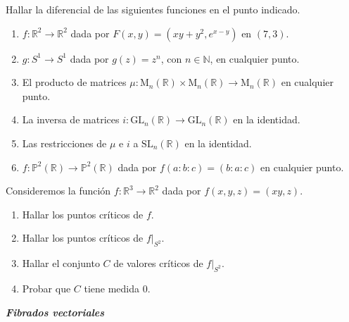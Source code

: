 \documentclass[12pt, a4paper]{amsart}
\theoremstyle{definition}
\newcommand{\RR}{\mathbb{R}}      %
\newcommand{\NN}{\mathbb{N}}
\begin{document}
\begin{question}
Hallar la diferencial de las siguientes funciones en el punto indicado.
\begin{enumerate}[label=\textbf{\alph*.}]
\item $f:\RR^2\to\RR^2$ dada por $F(x,y)=(xy+y^2,e^{x-y})$ en $(7,3)$.
\item $g:S^1\to S^1$ dada por $g(z)=z^n$, con $n\in\NN$, en cualquier punto.
\item El producto de matrices $\mu:\mathrm{M}_n(\RR)\times\mathrm{M}_n(\RR)\to\mathrm{M}_n(\RR)$ en cualquier punto.
\item La inversa de matrices $i:\mathrm{GL}_n(\RR)\to\mathrm{GL}_n(\RR)$ en la identidad.
\item Las restricciones de $\mu$ e $i$ a $\mathrm{SL}_n(\RR)$ en la identidad.
\item $f:\mathbb{P}^2(\RR)\to\mathbb{P}^2(\RR)$ dada por $f(a:b:c)=(b:a:c)$ en cualquier punto.
\end{enumerate}
\end{question}

\begin{question}
Consideremos la función $f:\RR^3\to\RR^2$ dada por $f(x,y,z) = (xy,z)$.
\begin{enumerate}[label=\textbf{\alph*.}]
\item Hallar los puntos críticos de $f$.
\item Hallar los puntos críticos de $\left.f\right|_{S^2}$.
\item Hallar el conjunto $C$ de valores críticos de $\left.f\right|_{S^2}$.
\item Probar que $C$ tiene medida $0$.
\end{enumerate}
\end{question}

\textsl{\textbf{Fibrados vectoriales}}
\end{document}

